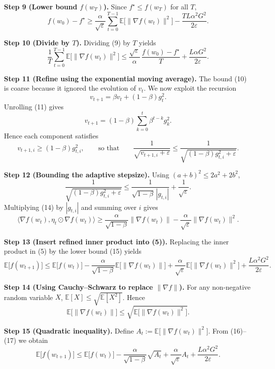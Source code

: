 \documentclass{article}
\newcommand{\EE}{\mathbb{E}}
\begin{document}
\noindent\textbf{Step 9 (Lower bound $f(w_{T})$).}  
Since $f^{\star}\le f(w_{T})$ for all $T$,
\[
f(w_{0})-f^{\star}
\ge \frac{\alpha}{\sqrt{\varepsilon}}\sum_{t=0}^{T-1}\EE\!\big[\|\nabla f(w_{t})\|^{2}\big]
- \frac{TL\alpha^{2}G^{2}}{2\varepsilon}.
\tag{9}
\]

\noindent\textbf{Step 10 (Divide by $T$).}  
Dividing (9) by $T$ yields
\[
\frac{1}{T}\sum_{t=0}^{T-1}\EE\!\big[\|\nabla f(w_{t})\|^{2}\big]
\le
\frac{\sqrt{\varepsilon}}{\alpha}\,\frac{f(w_{0})-f^{\star}}{T}
+ \frac{L\alpha G^{2}}{2\varepsilon}.
\tag{10}
\]

\noindent\textbf{Step 11 (Refine using the exponential moving average).}  
The bound (10) is coarse because it ignored the evolution of $v_{t}$.  
We now exploit the recursion
\[
v_{t+1}= \beta v_{t}+(1-\beta)g_{t}^{2}.
\tag{11}
\]
Unrolling (11) gives
\[
v_{t+1}= (1-\beta)\sum_{k=0}^{t}\beta^{t-k} g_{k}^{2}.
\tag{12}
\]
Hence each component satisfies
\[
v_{t+1,i}\ge (1-\beta)g_{t,i}^{2},
\qquad\text{so that}\qquad
\frac{1}{\sqrt{v_{t+1,i}+\varepsilon}}
\le \frac{1}{\sqrt{(1-\beta)g_{t,i}^{2}+\varepsilon}}.
\tag{13}
\]

\noindent\textbf{Step 12 (Bounding the adaptive stepsize).}  
Using $(a+b)^{2}\le 2a^{2}+2b^{2}$,
\[
\frac{1}{\sqrt{(1-\beta)g_{t,i}^{2}+\varepsilon}}
\le \frac{1}{\sqrt{1-\beta}\,|g_{t,i}|}
+ \frac{1}{\sqrt{\varepsilon}}.
\tag{14}
\]
Multiplying (14) by $|g_{t,i}|$ and summing over $i$ gives
\[
\big\langle\nabla f(w_{t}),\eta_{t}\odot \nabla f(w_{t})\big\rangle
\ge
\frac{\alpha}{\sqrt{1-\beta}}\|\nabla f(w_{t})\|
-\frac{\alpha}{\sqrt{\varepsilon}}\|\nabla f(w_{t})\|^{2}.
\tag{15}
\]

\noindent\textbf{Step 13 (Insert refined inner product into (5)).}  
Replacing the inner product in (5) by the lower bound (15) yields
\[
\EE\!\big[f(w_{t+1})\big]
\le \EE\!\big[f(w_{t})\big]
- \frac{\alpha}{\sqrt{1-\beta}}\EE\!\big[\|\nabla f(w_{t})\|\big]
+ \frac{\alpha}{\sqrt{\varepsilon}}\EE\!\big[\|\nabla f(w_{t})\|^{2}\big]
+ \frac{L\alpha^{2}G^{2}}{2\varepsilon}.
\tag{16}
\]

\noindent\textbf{Step 14 (Using Cauchy–Schwarz to replace $\|\nabla f\|$).}  
For any non‑negative random variable $X$, $\EE[X]\le \sqrt{\EE[X^{2}]}$. Hence
\[
\EE\!\big[\|\nabla f(w_{t})\|\big]
\le \sqrt{\EE\!\big[\|\nabla f(w_{t})\|^{2}\big]}.
\tag{17}
\]

\noindent\textbf{Step 15 (Quadratic inequality).}  
Define $A_{t}:=\EE\!\big[\|\nabla f(w_{t})\|^{2}\big]$.  
From (16)–(17) we obtain
\[
\EE\!\big[f(w_{t+1})\big]
\le \EE\!\big[f(w_{t})\big]
- \frac{\alpha}{\sqrt{1-\beta}}\sqrt{A_{t}}
+ \frac{\alpha}{\sqrt{\varepsilon}}A_{t}
+ \frac{L\alpha^{2}G^{2}}{2\varepsilon}.
\tag{18}
\]
\end{document}
